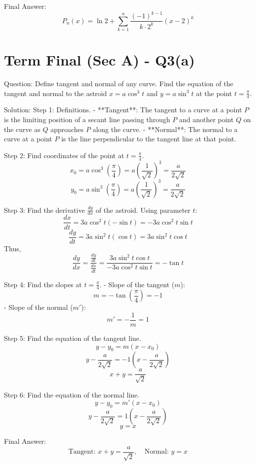 \documentclass[11pt, a4paper]{article}
\begin{document}
Final Answer:
$$
\boxed{P_n(x) = \ln 2 + \sum_{k=1}^{n} \frac{(-1)^{k-1}}{k \cdot 2^k} (x-2)^k}
$$


\section*{Term Final (Sec A) - Q3(a)}
Question:
Define tangent and normal of any curve. Find the equation of the tangent and normal to the astroid $x = a \cos^3 t$ and $y = a \sin^3 t$ at the point $t = \frac{\pi}{4}$.

Solution:
Step 1: Definitions.
- **Tangent**: The tangent to a curve at a point $P$ is the limiting position of a secant line passing through $P$ and another point $Q$ on the curve as $Q$ approaches $P$ along the curve.
- **Normal**: The normal to a curve at a point $P$ is the line perpendicular to the tangent line at that point.

Step 2: Find coordinates of the point at $t = \frac{\pi}{4}$.
$$x_0 = a \cos^3\left(\frac{\pi}{4}\right) = a \left(\frac{1}{\sqrt{2}}\right)^3 = \frac{a}{2\sqrt{2}}$$
$$y_0 = a \sin^3\left(\frac{\pi}{4}\right) = a \left(\frac{1}{\sqrt{2}}\right)^3 = \frac{a}{2\sqrt{2}}$$

Step 3: Find the derivative $\frac{dy}{dx}$ of the astroid.
Using parameter $t$:
$$\frac{dx}{dt} = 3a \cos^2 t (-\sin t) = -3a \cos^2 t \sin t$$
$$\frac{dy}{dt} = 3a \sin^2 t (\cos t) = 3a \sin^2 t \cos t$$
Thus,
$$\frac{dy}{dx} = \frac{\frac{dy}{dt}}{\frac{dx}{dt}} = \frac{3a \sin^2 t \cos t}{-3a \cos^2 t \sin t} = -\tan t$$

Step 4: Find the slopes at $t = \frac{\pi}{4}$.
- Slope of the tangent ($m$):
  $$m = -\tan\left(\frac{\pi}{4}\right) = -1$$
- Slope of the normal ($m'$):
  $$m' = -\frac{1}{m} = 1$$

Step 5: Find the equation of the tangent line.
$$y - y_0 = m(x - x_0)$$
$$y - \frac{a}{2\sqrt{2}} = -1\left(x - \frac{a}{2\sqrt{2}}\right)$$
$$x + y = \frac{a}{\sqrt{2}}$$

Step 6: Find the equation of the normal line.
$$y - y_0 = m'(x - x_0)$$
$$y - \frac{a}{2\sqrt{2}} = 1\left(x - \frac{a}{2\sqrt{2}}\right)$$
$$y = x$$

Final Answer:
$$
\boxed{\text{Tangent: } x + y = \frac{a}{\sqrt{2}}, \quad \text{Normal: } y = x}
$$
\end{document}
